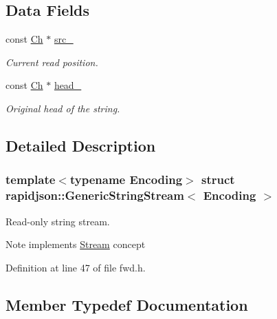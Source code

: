\subsection*{Data Fields}
\begin{DoxyCompactItemize}
\item 
const \mbox{\hyperlink{structrapidjson_1_1_generic_string_stream_a70ad06c96ddf8349be59f3d4f6bbadc8}{Ch}} $\ast$ \mbox{\hyperlink{structrapidjson_1_1_generic_string_stream_a9a38a9d5b1ce782cacd4ec1bdf87fc2d}{src\+\_\+}}
\begin{DoxyCompactList}\small\item\em Current read position. \end{DoxyCompactList}\item 
const \mbox{\hyperlink{structrapidjson_1_1_generic_string_stream_a70ad06c96ddf8349be59f3d4f6bbadc8}{Ch}} $\ast$ \mbox{\hyperlink{structrapidjson_1_1_generic_string_stream_a2556705b0a0fd6393862efe6db025b32}{head\+\_\+}}
\begin{DoxyCompactList}\small\item\em Original head of the string. \end{DoxyCompactList}\end{DoxyCompactItemize}


\subsection{Detailed Description}
\subsubsection*{template$<$typename Encoding$>$\newline
struct rapidjson\+::\+Generic\+String\+Stream$<$ Encoding $>$}

Read-\/only string stream. 

\begin{DoxyNote}{Note}
implements \mbox{\hyperlink{classrapidjson_1_1_stream}{Stream}} concept 
\end{DoxyNote}


Definition at line 47 of file fwd.\+h.



\subsection{Member Typedef Documentation}
\mbox{\label{structrapidjson_1_1_generic_string_stream_a70ad06c96ddf8349be59f3d4f6bbadc8}} 

